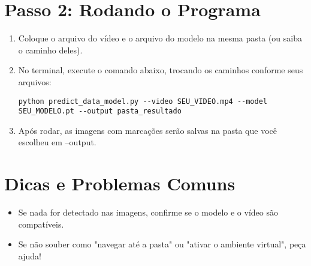 \documentclass[12pt,a4paper]{article}
\begin{document}
\section*{Passo 2: Rodando o Programa}
\begin{enumerate}[label=\arabic*.]
    \item Coloque o arquivo do vídeo e o arquivo do modelo na mesma pasta (ou saiba o caminho deles).
    \item No terminal, execute o comando abaixo, trocando os caminhos conforme seus arquivos:
    \begin{verbatim}
python predict_data_model.py --video SEU_VIDEO.mp4 --model SEU_MODELO.pt --output pasta_resultado
\end{verbatim}
    \item Após rodar, as imagens com marcações serão salvas na pasta que você escolheu em --output.
\end{enumerate}

\section*{Dicas e Problemas Comuns}
\begin{itemize}
    \item Se nada for detectado nas imagens, confirme se o modelo e o vídeo são compatíveis.
    \item Se não souber como "navegar até a pasta" ou "ativar o ambiente virtual", peça ajuda!
\end{itemize}
\end{document}
